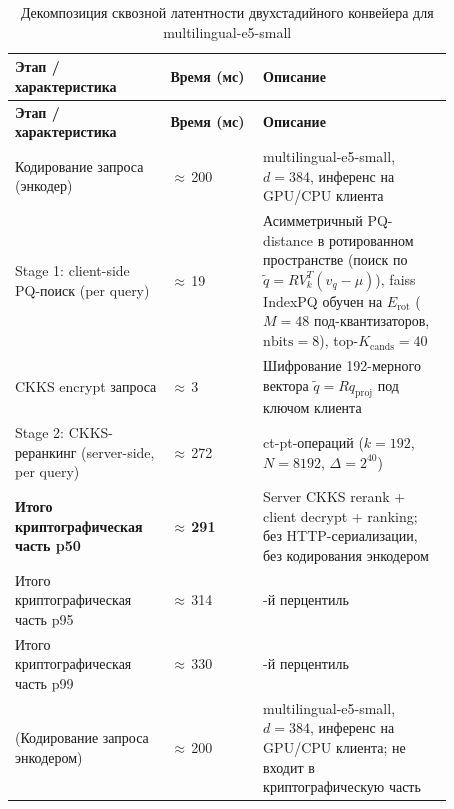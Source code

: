\documentclass[a4paper, 12pt, oneside, openany]{article}
\begin{document}
\begingroup\small\setlength{\tabcolsep}{3pt}
\begin{longtable}{@{}
		>{\raggedright\arraybackslash}p{0.29\linewidth}
		>{\raggedright\arraybackslash}p{0.19\linewidth}
		>{\raggedright\arraybackslash}p{0.39\linewidth}
		@{}}
	\caption{Декомпозиция сквозной латентности двухстадийного конвейера для multilingual-e5-small}\label{tab:5-2}\\*
	\toprule
	\textbf{Этап / характеристика} & \textbf{Время (мс)} & \textbf{Описание} \\
	\midrule
	\endfirsthead

	\toprule
	\textbf{Этап / характеристика} & \textbf{Время (мс)} & \textbf{Описание} \\
	\midrule
	\endhead

	\bottomrule
	\endfoot

	\bottomrule
	\endlastfoot

	Кодирование запроса (энкодер) &
	$\approx$\,200 &
	multilingual-e5-small, $d = 384$, инференс на GPU/CPU клиента \\

	Stage 1: client-side PQ-поиск (per query) &
	$\approx$\,19 &
	Асимметричный PQ-distance в ротированном пространстве (поиск по $\tilde q = R V_k^{T}(v_q - \mu)$), faiss IndexPQ обучен на $E_{\mathrm{rot}}$ ($M = 48$ под-квантизаторов, $\mathrm{nbits} = 8$), top-$K_{\mathrm{cands}} = 40$ \\

	CKKS encrypt запроса &
	$\approx$\,3 &
	Шифрование 192-мерного вектора $\tilde q = R q_{\mathrm{proj}}$ под ключом клиента \\

	Stage 2: CKKS-реранкинг (server-side, per query) &
	$\approx$\,272 &
	40 ct-pt-операций ($k = 192$, $N = 8192$, $\Delta = 2^{40}$) \\

	\textbf{Итого криптографическая часть p50} &
	$\approx$\,\textbf{291} &
	Server CKKS rerank + client decrypt + ranking; без HTTP-сериализации, без кодирования энкодером \\

	Итого криптографическая часть p95 &
	$\approx$\,314 &
	95-й перцентиль \\

	Итого криптографическая часть p99 &
	$\approx$\,330 &
	99-й перцентиль \\

	(Кодирование запроса энкодером) &
	$\approx$\,200 &
	multilingual-e5-small, $d = 384$, инференс на GPU/CPU клиента; не входит в криптографическую часть \\

\end{longtable}
\endgroup
\end{document}
